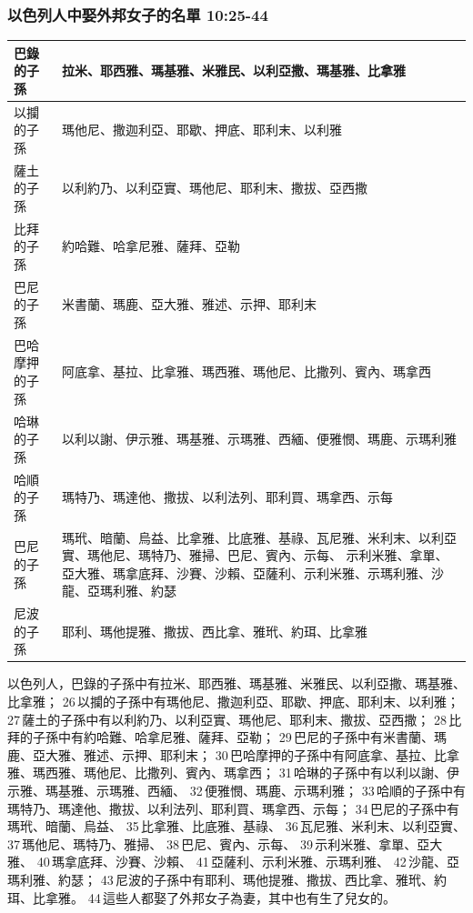 \subsubsection{以色列人中娶外邦女子的名單 10:25-44}
\begin{table}[H]
\centering 
\begin{tabular}{p{2.9cm}|p{12.5cm}}\hline\hline
 巴錄的子孫 & 拉米、耶西雅、瑪基雅、米雅民、以利亞撒、瑪基雅、比拿雅 \\\hline
以攔的子孫  &瑪他尼、撒迦利亞、耶歇、押底、耶利末、以利雅 \\\hline
 薩土的子孫 & 以利約乃、以利亞實、瑪他尼、耶利末、撒拔、亞西撒 \\\hline 
比拜的子孫  &約哈難、哈拿尼雅、薩拜、亞勒 \\\hline
 巴尼的子孫 & 米書蘭、瑪鹿、亞大雅、雅述、示押、耶利末 \\\hline
 巴哈摩押的子孫  &阿底拿、基拉、比拿雅、瑪西雅、瑪他尼、比撒列、賓內、瑪拿西 \\\hline
 哈琳的子孫 & 以利以謝、伊示雅、瑪基雅、示瑪雅、西緬、便雅憫、瑪鹿、示瑪利雅\\\hline
哈順的子孫  &瑪特乃、瑪達他、撒拔、以利法列、耶利買、瑪拿西、示每 \\\hline
 巴尼的子孫 & 瑪玳、暗蘭、烏益、比拿雅、比底雅、基祿、瓦尼雅、米利末、以利亞實、瑪他尼、瑪特乃、雅掃、巴尼、賓內、示每、 示利米雅、拿單、亞大雅、瑪拿底拜、沙賽、沙賴、亞薩利、示利米雅、示瑪利雅、沙龍、亞瑪利雅、約瑟\\\hline
 尼波的子孫  &耶利、瑪他提雅、撒拔、西比拿、雅玳、約珥、比拿雅\\\hline
\end{tabular}
\end{table}
以色列人，巴錄的子孫中有拉米、耶西雅、瑪基雅、米雅民、以利亞撒、瑪基雅、比拿雅； 26 以攔的子孫中有瑪他尼、撒迦利亞、耶歇、押底、耶利末、以利雅； 27 薩土的子孫中有以利約乃、以利亞實、瑪他尼、耶利末、撒拔、亞西撒； 28 比拜的子孫中有約哈難、哈拿尼雅、薩拜、亞勒； 29 巴尼的子孫中有米書蘭、瑪鹿、亞大雅、雅述、示押、耶利末； 30 巴哈摩押的子孫中有阿底拿、基拉、比拿雅、瑪西雅、瑪他尼、比撒列、賓內、瑪拿西； 31 哈琳的子孫中有以利以謝、伊示雅、瑪基雅、示瑪雅、西緬、 32 便雅憫、瑪鹿、示瑪利雅； 33 哈順的子孫中有瑪特乃、瑪達他、撒拔、以利法列、耶利買、瑪拿西、示每； 34 巴尼的子孫中有瑪玳、暗蘭、烏益、 35 比拿雅、比底雅、基祿、 36 瓦尼雅、米利末、以利亞實、 37 瑪他尼、瑪特乃、雅掃、 38 巴尼、賓內、示每、 39 示利米雅、拿單、亞大雅、 40 瑪拿底拜、沙賽、沙賴、 41 亞薩利、示利米雅、示瑪利雅、 42 沙龍、亞瑪利雅、約瑟； 43 尼波的子孫中有耶利、瑪他提雅、撒拔、西比拿、雅玳、約珥、比拿雅。 44 這些人都娶了外邦女子為妻，其中也有生了兒女的。


